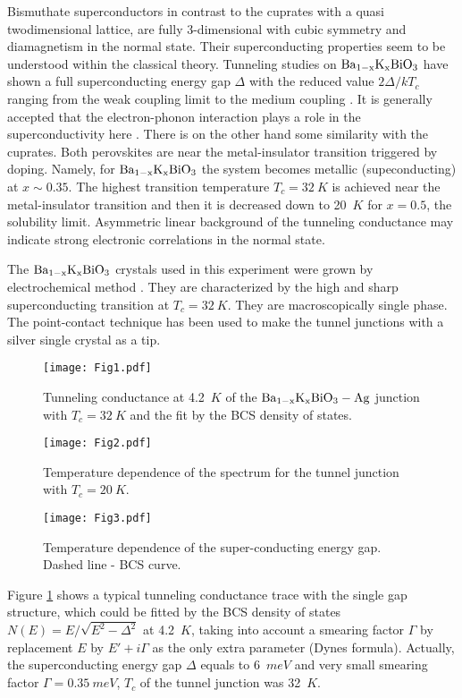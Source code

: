 \documentclass[twocolumn,amsmath,floats,showpacs,nofootinbib]{revtex4}
\begin{document}
Bismuthate superconductors in contrast to the cuprates with a quasi twodimensional lattice, are fully 3-dimensional with cubic symmetry and diamagnetism in the normal state. Their superconducting properties seem to be understood within the classical theory. Tunneling studies on $\rm Ba_{1-x}K_xBiO_3$ have shown a full superconducting energy gap $\Delta$ with the reduced value $2\Delta/kT_c$ ranging from the weak coupling limit \cite{1,2} to the medium coupling \cite{3}. It is generally accepted that the electron-phonon interaction plays a role in the superconductivity here \cite{1,3}. There is on the other hand some similarity with the cuprates. Both perovskites are near the metal-insulator transition triggered by doping. Namely, for $\rm Ba_{1-x}K_xBiO_3$ the system becomes metallic (supeconducting) at $x\sim 0.35$. The highest transition temperature $T_c=32\ K$ is achieved near the metal-insulator transition and then it is decreased down to 20~$K$ for $x=0.5$, the solubility limit. Asymmetric linear background of the tunneling conductance may indicate strong electronic correlations in the normal state.

The $\rm Ba_{1-x}K_xBiO_3$ crystals used in this experiment were grown by electrochemical method \cite{4}. They are characterized by the high and sharp superconducting transition at $T_c=32\ K$. They are macroscopically single phase. The point-contact technique has been used to make the tunnel junctions with a silver single crystal as a tip.
\begin{figure}[h!]
\texttt{[image: Fig1.pdf]}
\caption[]{Tunneling conductance at 4.2~$K$ of the $\rm Ba_{1-x}K_xBiO_3-Ag$ junction with $T_c=32\ K$ and the fit by the BCS density of states.}
\label{Fig1}
\end{figure}

\begin{figure}[]
\texttt{[image: Fig2.pdf]}
\caption[]{Temperature dependence of the spectrum for the tunnel junction with $T_c=20\ K$.}
\label{Fig2}
\end{figure}

\begin{figure}[]
\texttt{[image: Fig3.pdf]}
\caption[]{Temperature dependence of the super-conducting energy gap. Dashed line - BCS curve.}
\label{Fig3}
\end{figure}

Figure \ref{Fig1} shows a typical tunneling conductance trace with the single gap structure, which could
be fitted by the BCS density of states $N(E)=E/\sqrt{{{E}^{2}}-{{\Delta }^{2}}}$ at 4.2~$K$, taking into account a smearing factor $\Gamma$ by replacement $E$ by $E' + i\Gamma$ as the only extra parameter (Dynes formula). Actually, the superconducting energy gap $\Delta$ equals to 6~$meV$ and very small smearing factor $\Gamma = 0.35\ meV$, $T_c$ of the tunnel junction was 32~$K$.
\end{document}
